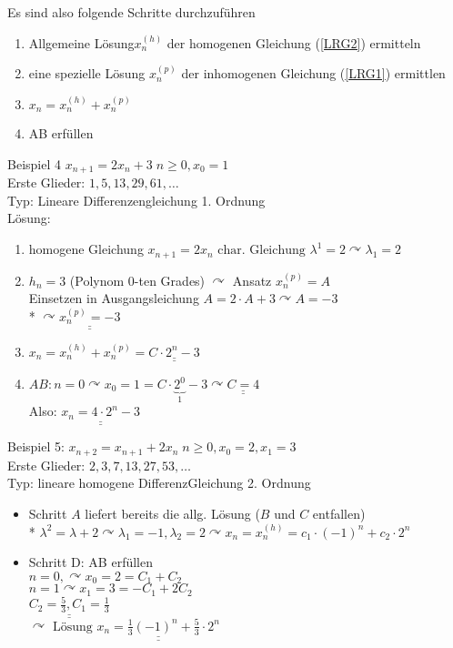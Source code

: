 \documentclass[a4paper]{scrartcl}
\begin{document}
Es sind also folgende Schritte durchzuführen
\begin{enumerate}
\item Allgemeine Lösung$x_n^{(h)}$ der homogenen Gleichung (\ref{LRG2}) ermitteln
\item eine spezielle Lösung $x_n^{(p)}$ der inhomogenen Gleichung (\ref{LRG1}) ermittlen
\item $x_n = x_n^{(h)} + x_n^{(p)}$
\item AB erfüllen
\end{enumerate}

Beispiel 4 $x_{n+1} = 2x_n + 3 \; n \geq 0, x_0 = 1$\\
Erste Glieder: $1,5,13,29,61, \dots$\\
Typ: Lineare Differenzengleichung 1. Ordnung\\

Lösung:
\begin{enumerate}
\item homogene Gleichung $x_{n+1} = 2x_n \text{ char. Gleichung } \lambda^1 = 2 \curvearrowright \lambda_1 = 2$
\item $h_n = 3$ (Polynom 0-ten Grades) $\curvearrowright$ Ansatz $x_n^{(p)}=A$\\
Einsetzen in Ausgangsleichung $A=2 \cdot A + 3 \curvearrowright A = -3$\\*
$\curvearrowright \underline{\underline{x_n^{(p)} = -3}}$
\item $x_n = x_n^{(h)} + x_n^{(p)} = \underline{\underline{C \cdot 2^n -3}}$
\item $AB: n=0 \curvearrowright x_0 =1 = C\cdot \underbrace{2^0}_{1} -3 \curvearrowright \underline{\underline{C=4}}$\\
Also: $\underline{\underline{x_n= 4 \cdot 2^n -3}}$
\end{enumerate}

Beispiel 5: $x_{n+2} = x_{n+1} + 2 x_n \; n \geq 0, x_0 =2 , x_1 = 3$\\
Erste Glieder: $2,3,7,13,27,53,\dots$\\
Typ: lineare homogene DifferenzGleichung 2. Ordnung
\begin{itemize}
\item Schritt $A$ liefert bereits die allg. Lösung ($B$ und $C$ entfallen)\\*
$\lambda^2 = \lambda +2 \curvearrowright \lambda_1 = -1, \lambda_2= 2 \curvearrowright x_n = x_n^{(h)} = c_1 \cdot (-1)^n + c_2 \cdot 2^n$

\item Schritt D: AB erfüllen\\
$n=0, \curvearrowright x_0 = 2 = C_1 + C_2$\\
$n=1 \curvearrowright x_1 = 3 = -C_1 + 2 C_2$\\
$\underline{\underline{C_2 = \frac{5}{3} , C_1 = \frac{1}{3}}}$\\
$\curvearrowright \text{ Lösung } \underline{\underline{x_n = \frac{1}{3} (-1)^n + \frac{5}{3} \cdot 2^n}}$
\end{itemize}
\end{document}
